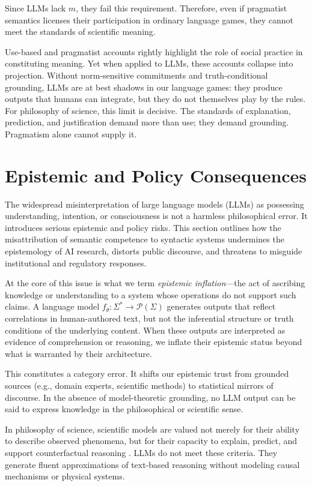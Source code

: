 \documentclass[12pt]{article}
\theoremstyle{plain}
\theoremstyle{definition}
\theoremstyle{remark}
\begin{document}
Since LLMs lack $m$, they fail this requirement. 
Therefore, even if pragmatist semantics licenses their participation 
in ordinary language games, they cannot meet the standards 
of scientific meaning. 

Use-based and pragmatist accounts rightly highlight the role of social practice 
in constituting meaning. Yet when applied to LLMs, these accounts collapse 
into projection. Without norm-sensitive commitments and truth-conditional 
grounding, LLMs are at best shadows in our language games: 
they produce outputs that humans can integrate, but they do not themselves 
play by the rules. For philosophy of science, this limit is decisive. 
The standards of explanation, prediction, and justification demand more 
than use; they demand grounding. Pragmatism alone cannot supply it.

\section{Epistemic and Policy Consequences}

The widespread misinterpretation of large language models (LLMs) as possessing understanding, intention, or consciousness is not a harmless philosophical error. It introduces serious epistemic and policy risks. This section outlines how the misattribution of semantic competence to syntactic systems undermines the epistemology of AI research, distorts public discourse, and threatens to misguide institutional and regulatory responses.

At the core of this issue is what we term \textit{epistemic inflation}—the act of ascribing knowledge or understanding to a system whose operations do not support such claims. A language model \( f_\theta: \Sigma^* \rightarrow \mathcal{P}(\Sigma) \) generates outputs that reflect correlations in human-authored text, but not the inferential structure or truth conditions of the underlying content. When these outputs are interpreted as evidence of comprehension or reasoning, we inflate their epistemic status beyond what is warranted by their architecture.

This constitutes a category error. It shifts our epistemic trust from grounded sources (e.g., domain experts, scientific methods) to statistical mirrors of discourse. In the absence of model-theoretic grounding, no LLM output can be said to express knowledge in the philosophical or scientific sense.

In philosophy of science, scientific models are valued not merely for their ability to describe observed phenomena, but for their capacity to explain, predict, and support counterfactual reasoning \parencite{vanfraassen1980scientific}. LLMs do not meet these criteria. They generate fluent approximations of text-based reasoning without modeling causal mechanisms or physical systems.
\end{document}

